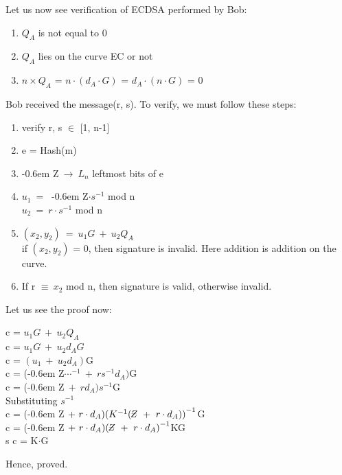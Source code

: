 \documentclass[11pt]{article}
\newcommand{\zbar}{\raisebox{0.2ex}{--}\kern-0.6em Z}
\begin{document}
Let us now see verification of ECDSA performed by Bob:
\begin{enumerate}
    \item $Q_A$ is not equal to 0
    \item $Q_A$ lies on the curve EC or not
    \item $n\times Q_A$ = $n \cdot (d_A \cdot G)$ = $d_A \cdot (n \cdot G)$ = 0
\end{enumerate}
Bob received the message(r, s). To verify, we must follow these steps:
\begin{enumerate}
    \item verify r, s $\in$ [1, n-1]
    \item e = Hash(m)
    \item \zbar $\ \rightarrow\ L_n$ leftmost bits of e
    \item $u_1 \ =\ $ \zbar$\cdot s^{-1}$ mod n\\
    $u_2\ =\ r \cdot s^{-1}$ mod n
    \item $(x_2, y_2)\ =\ u_1G\ +\ u_2Q_A$\\
    if $(x_2, y_2)$ = 0, then signature is invalid. Here addition is addition on the curve.
    \item If r $\equiv\ x_2$ mod n, then signature is valid, otherwise invalid.
\end{enumerate}
Let us see the proof now:\\
\begin{center}
    c = $u_1G\ +\ u_2Q_A$\\
    \vspace{1mm}
    c = $u_1G\ +\ u_2d_AG$\\
    \vspace{1mm}
    c = $(u_1\ +\ u_2d_A)$G\\
    \vspace{1mm}
    c = (\zbar$\cdots^{-1}\ +\ rs^{-1}d_A)$G\\
    \vspace{1mm}
    c = (\zbar $\ +\ rd_A)s^{-1}$G\\
    \vspace{1mm}
    Substituting $s^{-1}$\\
    \vspace{1mm}
    c = (\zbar $\ +\ r\cdot d_A){(K^{-1}(\zbar\ +\ r\cdot d_A))}^{-1}$G\\
    \vspace{1mm}
    c = (\zbar $\ +\ r\cdot d_A){(\zbar\ +\ r \cdot d_A)}^{-1}$KG\\
    \vspace{1mm}s
    c = K$\cdot$G
\end{center}
Hence, proved.
\end{document}

